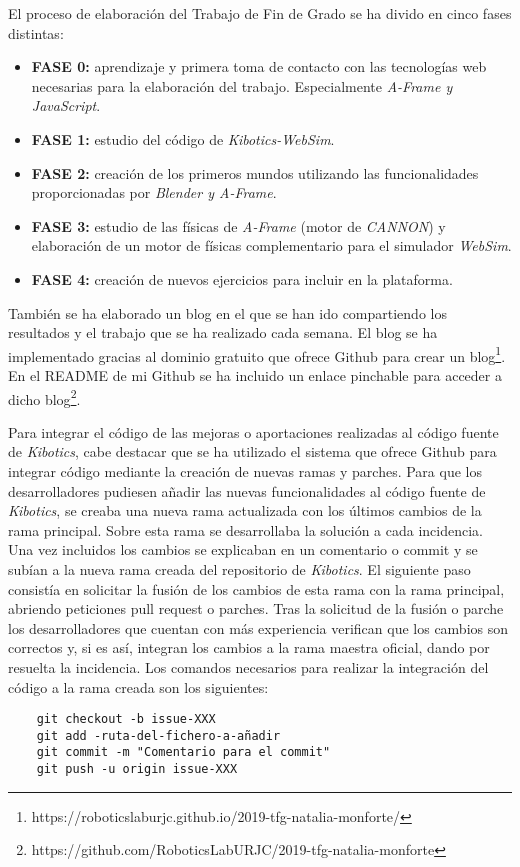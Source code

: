 El proceso de elaboración del Trabajo de Fin de Grado se ha divido en cinco fases distintas:
\begin{itemize}
    \item \textbf{FASE 0:} aprendizaje y primera toma de contacto con las tecnologías web necesarias para la elaboración del trabajo. Especialmente \textit{A-Frame y JavaScript}.
    \item \textbf{FASE 1:} estudio del código de \textit{Kibotics-WebSim}.
    \item \textbf{FASE 2:} creación de los primeros mundos utilizando las funcionalidades proporcionadas por \textit{Blender y A-Frame}.
    \item \textbf{FASE 3:} estudio de las físicas de \textit{A-Frame} (motor de \textit{CANNON}) y elaboración de un motor de físicas complementario para el simulador \textit{WebSim}.
    \item \textbf{FASE 4:} creación de nuevos ejercicios para incluir en la plataforma.
\end{itemize}


También se ha elaborado un blog en el que se han ido compartiendo los resultados y el trabajo que se ha realizado cada semana. El blog se ha implementado gracias al dominio gratuito que ofrece Github para crear un blog\footnote{https://roboticslaburjc.github.io/2019-tfg-natalia-monforte/}. En el README de mi Github se ha incluido un enlace pinchable para acceder a dicho blog\footnote{https://github.com/RoboticsLabURJC/2019-tfg-natalia-monforte}. \newline


Para integrar el código de las mejoras o aportaciones realizadas al código fuente de \textit{Kibotics}, cabe destacar que se ha utilizado el sistema que ofrece Github para integrar código mediante la creación de nuevas ramas y parches. Para que los desarrolladores pudiesen añadir las nuevas funcionalidades al código fuente de \textit{Kibotics}, se creaba una nueva rama actualizada con los últimos cambios de la rama
principal. Sobre esta rama se desarrollaba la solución a cada incidencia. Una vez incluidos los cambios se explicaban en un comentario o commit y se subían a la nueva rama creada del repositorio de \textit{Kibotics}. El siguiente paso consistía en solicitar la fusión de los cambios de esta rama con
la rama principal, abriendo peticiones pull request o parches. Tras la solicitud de la fusión o parche los desarrolladores que cuentan con más experiencia verifican que los cambios son correctos y, si es así, integran los cambios a la rama maestra oficial, dando por resuelta la incidencia. Los comandos necesarios para realizar la integración del código a la rama creada son los siguientes: 

\begin{verbatim}
    git checkout -b issue-XXX
    git add -ruta-del-fichero-a-añadir
    git commit -m "Comentario para el commit"
    git push -u origin issue-XXX
\end{verbatim}

